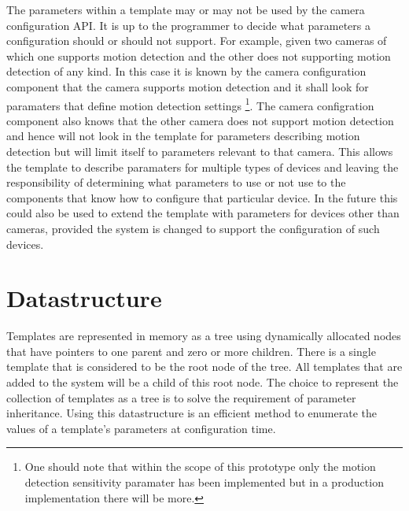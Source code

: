 The parameters within a template may or may not be used by the camera configuration API.
It is up to the programmer to decide what parameters a configuration should or should not support.
For example, given two cameras of which one supports motion detection and the other does not supporting motion detection of any kind.
In this case it is known by the camera configuration component that the camera supports motion detection and it shall look for paramaters that define motion detection settings
\footnote{One should note that within the scope of this prototype only the motion detection sensitivity paramater has been implemented but in a production implementation there will be more.}.
The camera configration component also knows that the other camera does not support motion detection and hence will not look in the template for parameters describing motion detection but will limit itself to parameters relevant to that camera.
This allows the template to describe paramaters for multiple types of devices and leaving the responsibility of determining what parameters to use or not use to the components that know how to configure that particular device.
In the future this could also be used to extend the template with parameters for devices other than cameras, provided the system is changed to support the configuration of such devices.

\section{Datastructure}
Templates are represented in memory as a tree using dynamically allocated nodes that have pointers to one parent and zero or more children.
There is a single template that is considered to be the root node of the tree.
All templates that are added to the system will be a child of this root node.
The choice to represent the collection of templates as a tree is to solve the requirement of parameter inheritance.
Using this datastructure is an efficient method to enumerate the values of a template's parameters at configuration time.

